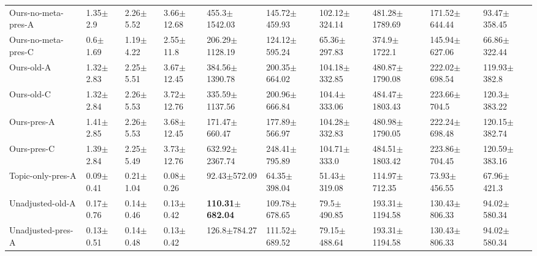 \begin{tabular}{llllllllll}
Ours-no-meta-pres-A &   1.35$\pm$2.9 &  2.26$\pm$5.52 &  3.66$\pm$12.68 &           455.3$\pm$1542.03 &     145.72$\pm$459.93 &     102.12$\pm$324.14 &  481.28$\pm$1789.69 &   171.52$\pm$644.44 &   93.47$\pm$358.45 \\
Ours-no-meta-pres-C &   0.6$\pm$1.69 &  1.19$\pm$4.22 &   2.55$\pm$11.8 &          206.29$\pm$1128.19 &     124.12$\pm$595.24 &      65.36$\pm$297.83 &    374.9$\pm$1722.1 &   145.94$\pm$627.06 &   66.86$\pm$322.44 \\
Ours-old-A          &  1.32$\pm$2.83 &  2.25$\pm$5.51 &  3.67$\pm$12.45 &          384.56$\pm$1390.78 &     200.35$\pm$664.02 &     104.18$\pm$332.85 &  480.87$\pm$1790.08 &   222.02$\pm$698.54 &   119.93$\pm$382.8 \\
Ours-old-C          &  1.32$\pm$2.84 &  2.26$\pm$5.53 &  3.72$\pm$12.76 &          335.59$\pm$1137.56 &     200.96$\pm$666.84 &      104.4$\pm$333.06 &  484.47$\pm$1803.43 &    223.66$\pm$704.5 &   120.3$\pm$383.22 \\
Ours-pres-A         &  1.41$\pm$2.85 &  2.26$\pm$5.53 &  3.68$\pm$12.45 &           171.47$\pm$660.47 &     177.89$\pm$566.97 &     104.28$\pm$332.83 &  480.98$\pm$1790.05 &   222.24$\pm$698.48 &  120.15$\pm$382.74 \\
Ours-pres-C         &  1.39$\pm$2.84 &  2.25$\pm$5.49 &  3.73$\pm$12.76 &          632.92$\pm$2367.74 &     248.41$\pm$795.89 &      104.71$\pm$333.0 &  484.51$\pm$1803.42 &   223.86$\pm$704.45 &  120.59$\pm$383.16 \\
Topic-only-pres-A   &  0.09$\pm$0.41 &  0.21$\pm$1.04 &   0.08$\pm$0.26 &            92.43$\pm$572.09 &      64.35$\pm$398.04 &      51.43$\pm$319.08 &   114.97$\pm$712.35 &    73.93$\pm$456.55 &    67.96$\pm$421.3 \\
Unadjusted-old-A    &  0.17$\pm$0.76 &  0.14$\pm$0.46 &   0.13$\pm$0.42 &  \textbf{110.31$\pm$682.04} &     109.78$\pm$678.65 &       79.5$\pm$490.85 &  193.31$\pm$1194.58 &   130.43$\pm$806.33 &   94.02$\pm$580.34 \\
Unadjusted-pres-A   &  0.13$\pm$0.51 &  0.14$\pm$0.48 &   0.13$\pm$0.42 &            126.8$\pm$784.27 &     111.52$\pm$689.52 &      79.15$\pm$488.64 &  193.31$\pm$1194.58 &   130.43$\pm$806.33 &   94.02$\pm$580.34 \\
\bottomrule
\end{tabular}
